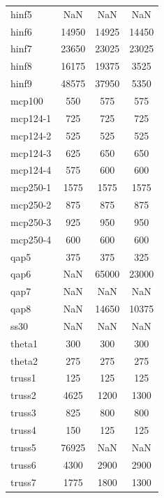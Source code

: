 \begin{longtable}{lccc}
hinf5    &      NaN &      NaN &      NaN \\
hinf6    &    14950 &    14925 &    14450 \\
hinf7    &    23650 &    23025 &    23025 \\
hinf8    &    16175 &    19375 &     3525 \\
hinf9    &    48575 &    37950 &     5350 \\
mcp100   &      550 &      575 &      575 \\
mcp124-1 &      725 &      725 &      725 \\
mcp124-2 &      525 &      525 &      525 \\
mcp124-3 &      625 &      650 &      650 \\
mcp124-4 &      575 &      600 &      600 \\
mcp250-1 &     1575 &     1575 &     1575 \\
mcp250-2 &      875 &      875 &      875 \\
mcp250-3 &      925 &      950 &      950 \\
mcp250-4 &      600 &      600 &      600 \\
qap5     &      375 &      375 &      325 \\
qap6     &      NaN &    65000 &    23000 \\
qap7     &      NaN &      NaN &      NaN \\
qap8     &      NaN &    14650 &    10375 \\
ss30     &      NaN &      NaN &      NaN \\
theta1   &      300 &      300 &      300 \\
theta2   &      275 &      275 &      275 \\
truss1   &      125 &      125 &      125 \\
truss2   &     4625 &     1200 &     1300 \\
truss3   &      825 &      800 &      800 \\
truss4   &      150 &      125 &      125 \\
truss5   &    76925 &      NaN &      NaN \\
truss6   &     4300 &     2900 &     2900 \\
truss7   &     1775 &     1800 &     1300 \\
\end{longtable}
